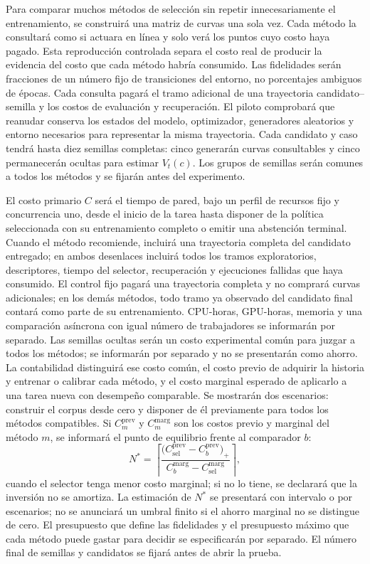 \documentclass[11pt,letterpaper]{article}
\newcommand{\Vt}{V_t}
\begin{document}
Para comparar muchos métodos de selección sin repetir innecesariamente el entrenamiento, se construirá una matriz de curvas una sola vez.
Cada método la consultará como si actuara en línea y solo verá los puntos cuyo costo haya pagado.
Esta reproducción controlada separa el costo real de producir la evidencia del costo que cada método habría consumido.
Las fidelidades serán fracciones de un número fijo de transiciones del entorno, no porcentajes ambiguos de épocas.
Cada consulta pagará el tramo adicional de una trayectoria candidato--semilla y los costos de evaluación y recuperación.
El piloto comprobará que reanudar conserva los estados del modelo, optimizador, generadores aleatorios y entorno necesarios para representar la misma trayectoria.
Cada candidato y caso tendrá hasta diez semillas completas: cinco generarán curvas consultables y cinco permanecerán ocultas para estimar $\Vt(c)$.
Los grupos de semillas serán comunes a todos los métodos y se fijarán antes del experimento.

El costo primario $C$ será el tiempo de pared, bajo un perfil de recursos fijo y concurrencia uno, desde el inicio de la tarea hasta disponer de la política seleccionada con su entrenamiento completo o emitir una abstención terminal.
Cuando el método recomiende, incluirá una trayectoria completa del candidato entregado; en ambos desenlaces incluirá todos los tramos exploratorios, descriptores, tiempo del selector, recuperación y ejecuciones fallidas que haya consumido.
El control fijo pagará una trayectoria completa y no comprará curvas adicionales; en los demás métodos, todo tramo ya observado del candidato final contará como parte de su entrenamiento.
CPU-horas, GPU-horas, memoria y una comparación asíncrona con igual número de trabajadores se informarán por separado.
Las semillas ocultas serán un costo experimental común para juzgar a todos los métodos; se informarán por separado y no se presentarán como ahorro.
La contabilidad distinguirá ese costo común, el costo previo de adquirir la historia y entrenar o calibrar cada método, y el costo marginal esperado de aplicarlo a una tarea nueva con desempeño comparable.
Se mostrarán dos escenarios: construir el corpus desde cero y disponer de él previamente para todos los métodos compatibles.
Si $C^{\mathrm{prev}}_m$ y $C^{\mathrm{marg}}_m$ son los costos previo y marginal del método $m$, se informará el punto de equilibrio frente al comparador $b$:
\begin{equation}
  N^*=\left\lceil
  \frac{\bigl(C^{\mathrm{prev}}_{\mathrm{sel}}-C^{\mathrm{prev}}_b\bigr)_+}
       {C^{\mathrm{marg}}_b-C^{\mathrm{marg}}_{\mathrm{sel}}}
  \right\rceil,
\end{equation}
cuando el selector tenga menor costo marginal; si no lo tiene, se declarará que la inversión no se amortiza.
La estimación de $N^*$ se presentará con intervalo o por escenarios; no se anunciará un umbral finito si el ahorro marginal no se distingue de cero.
El presupuesto que define las fidelidades y el presupuesto máximo que cada método puede gastar para decidir se especificarán por separado.
El número final de semillas y candidatos se fijará antes de abrir la prueba.
\end{document}
